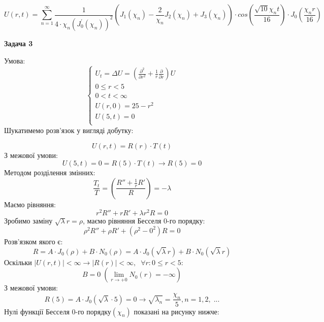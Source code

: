 \documentclass[]{article}
\begin{document}
\[U(r,t) = \sum_{n=1}^{\infty} \frac{1}{4\cdot\chi_n\left(J_0^{'}(\chi_n)\right)^2}\left(J_1(\chi_n)-\frac{2}{\chi_n}J_2(\chi_n)+J_3(\chi_n)\right)\cdot cos\left(\frac{\sqrt{10}\chi_n t}{16}\right)\cdot J_0\left(\frac{\chi_n r}{16}\right)\]

\newpage
\begin{center}
    \textbf{Задача 3}
\end{center}
Умова:
\begin{equation*}
    \begin{cases}
      U_{t}=\Delta U  = \left(\frac{\partial^2}{\partial r^2}+\frac{1}{r}\frac{\partial}{\partial r}\right)U\\
      0\leq r<5\\
      0<t<\infty\\
      U(r,0) = 25-r^2\\
      U(5,t) = 0\\
    \end{cases}
\end{equation*}
Шукатимемо розв'язок у вигляді добутку:

\[U(r,t) = R(r)\cdot T(t)\]
З межової умови:
\[U(5,t)=0=R(5)\cdot T(t)\rightarrow R(5)=0\]
Методом розділення змінних:
\[\frac{T_{t}}{T}=\left(\frac{R''+\frac{1}{r}R'}{R}\right)=-\lambda\]
Маємо рівняння:
\[r^2R''+rR'+\lambda r^2R=0\]
Зробимо заміну $\sqrt{\lambda} r = \rho$, маємо рівняння Бесселя 0-го порядку:
\[\rho^2R''+\rho R'+\left(\rho^2-0^2\right)R=0\]
Розв'язком якого є:
\[R = A\cdot J_0(\rho)+B\cdot N_0(\rho) = A\cdot J_0(\sqrt{\lambda}r)+B\cdot N_0(\sqrt{\lambda}r) \]
Оскільки $\big|U(r,t)\big|<\infty\rightarrow\big|R(r)\big|<\infty,\;\;\forall r: 0\leq r<5$:
\[B = 0\;\left(\lim_{r\rightarrow +0} N_0(r) = -\infty\right)\]
З межової умови:
\[R(5) = A\cdot J_0(\sqrt{\lambda}\cdot 5) = 0 \rightarrow \sqrt{\lambda_n} = \frac{\chi_n}{5}, n = 1,2,\;...\]
\newpage
Нулі функції Бесселя 0-го порядку$\left(\chi_n\right)$ показані на рисунку нижче:
\begin{figure}[!h]
    \label{fig:flow}
\end{figure}
\end{document}

